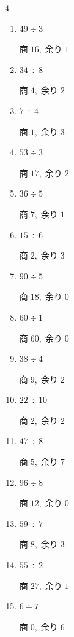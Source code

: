 \begin{multicols}{4}
\begin{enumerate}
  \item $49 \div 3$

        $商\; 16,\; 余り\; 1$

  \item $34 \div 8$

        $商\; 4,\; 余り\; 2$

  \item $7 \div 4$

        $商\; 1,\; 余り\; 3$

  \item $53 \div 3$

        $商\; 17,\; 余り\; 2$

  \item $36 \div 5$

        $商\; 7,\; 余り\; 1$

  \item $15 \div 6$

        $商\; 2,\; 余り\; 3$

\columnbreak %

  \item $90 \div 5$

        $商\; 18,\; 余り\; 0$

  \item $60 \div 1$

        $商\; 60,\; 余り\; 0$

  \item $38 \div 4$

        $商\; 9,\; 余り\; 2$

  \item $22 \div 10$

        $商\; 2,\; 余り\; 2$

  \item $47 \div 8$

        $商\; 5,\; 余り\; 7$

  \item $96 \div 8$

        $商\; 12,\; 余り\; 0$

  \item $59 \div 7$

        $商\; 8,\; 余り\; 3$

  \item $55 \div 2$

        $商\; 27,\; 余り\; 1$

  \item $6 \div 7$

        $商\; 0,\; 余り\; 6$


\end{enumerate}
\end{multicols}
